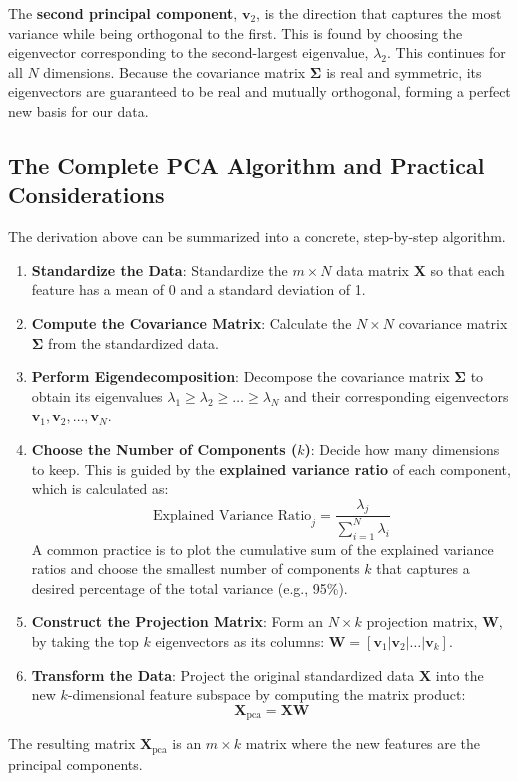The \textbf{second principal component}, $\mathbf{v}_2$, is the direction that captures the most variance while being orthogonal to the first. This is found by choosing the eigenvector corresponding to the second-largest eigenvalue, $\lambda_2$. This continues for all $N$ dimensions. Because the covariance matrix $\mathbf{\Sigma}$ is real and symmetric, its eigenvectors are guaranteed to be real and mutually orthogonal, forming a perfect new basis for our data.

\subsection{The Complete PCA Algorithm and Practical Considerations}
The derivation above can be summarized into a concrete, step-by-step algorithm.

\begin{enumerate}
    \item \textbf{Standardize the Data}: Standardize the $m \times N$ data matrix $\mathbf{X}$ so that each feature has a mean of 0 and a standard deviation of 1.
    \item \textbf{Compute the Covariance Matrix}: Calculate the $N \times N$ covariance matrix $\mathbf{\Sigma}$ from the standardized data.
    \item \textbf{Perform Eigendecomposition}: Decompose the covariance matrix $\mathbf{\Sigma}$ to obtain its eigenvalues $\lambda_1 \ge \lambda_2 \ge \dots \ge \lambda_N$ and their corresponding eigenvectors $\mathbf{v}_1, \mathbf{v}_2, \dots, \mathbf{v}_N$.
    \item \textbf{Choose the Number of Components ($k$)}: Decide how many dimensions to keep. This is guided by the \textbf{explained variance ratio} of each component, which is calculated as:
    $$ \text{Explained Variance Ratio}_j = \frac{\lambda_j}{\sum_{i=1}^N \lambda_i} $$
    A common practice is to plot the cumulative sum of the explained variance ratios and choose the smallest number of components $k$ that captures a desired percentage of the total variance (e.g., 95\%).
    \item \textbf{Construct the Projection Matrix}: Form an $N \times k$ projection matrix, $\mathbf{W}$, by taking the top $k$ eigenvectors as its columns: $\mathbf{W} = [\mathbf{v}_1 | \mathbf{v}_2 | \dots | \mathbf{v}_k]$.
    \item \textbf{Transform the Data}: Project the original standardized data $\mathbf{X}$ into the new $k$-dimensional feature subspace by computing the matrix product:
    $$ \mathbf{X}_{\text{pca}} = \mathbf{XW} $$
\end{enumerate}
The resulting matrix $\mathbf{X}_{\text{pca}}$ is an $m \times k$ matrix where the new features are the principal components.

